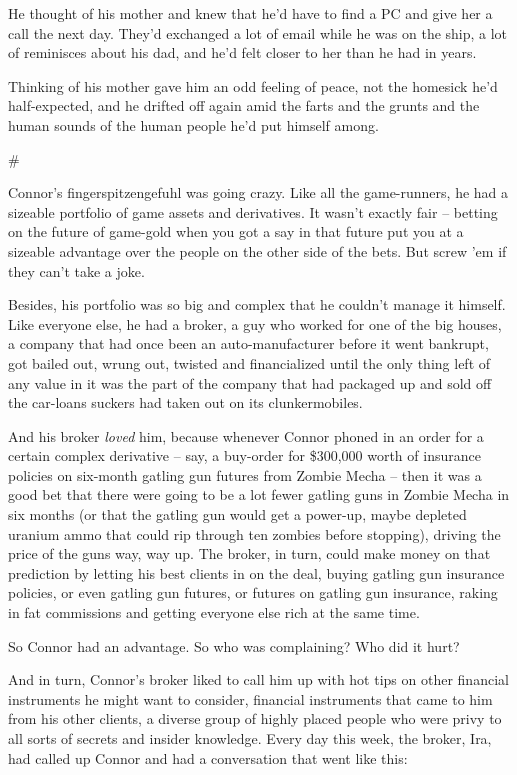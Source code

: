 He thought of his mother and knew that he'd have to find a PC and
give her a call the next day. They'd exchanged a lot of email while
he was on the ship, a lot of reminisces about his dad, and he'd
felt closer to her than he had in years.

Thinking of his mother gave him an odd feeling of peace, not the
homesick he'd half-expected, and he drifted off again amid the
farts and the grunts and the human sounds of the human people he'd
put himself among.

\#

Connor's fingerspitzengefuhl was going crazy. Like all the
game-runners, he had a sizeable portfolio of game assets and
derivatives. It wasn't exactly fair -- betting on the future of
game-gold when you got a say in that future put you at a sizeable
advantage over the people on the other side of the bets. But screw
'em if they can't take a joke.

Besides, his portfolio was so big and complex that he couldn't
manage it himself. Like everyone else, he had a broker, a guy who
worked for one of the big houses, a company that had once been an
auto-manufacturer before it went bankrupt, got bailed out, wrung
out, twisted and financialized until the only thing left of any
value in it was the part of the company that had packaged up and
sold off the car-loans suckers had taken out on its
clunkermobiles.

And his broker \emph{loved} him, because whenever Connor phoned in
an order for a certain complex derivative -- say, a buy-order for
\$300,000 worth of insurance policies on six-month gatling gun
futures from Zombie Mecha -- then it was a good bet that there were
going to be a lot fewer gatling guns in Zombie Mecha in six months
(or that the gatling gun would get a power-up, maybe depleted
uranium ammo that could rip through ten zombies before stopping),
driving the price of the guns way, way up. The broker, in turn,
could make money on that prediction by letting his best clients in
on the deal, buying gatling gun insurance policies, or even gatling
gun futures, or futures on gatling gun insurance, raking in fat
commissions and getting everyone else rich at the same time.

So Connor had an advantage. So who was complaining? Who did it
hurt?

And in turn, Connor's broker liked to call him up with hot tips on
other financial instruments he might want to consider, financial
instruments that came to him from his other clients, a diverse
group of highly placed people who were privy to all sorts of
secrets and insider knowledge. Every day this week, the broker,
Ira, had called up Connor and had a conversation that went like
this:

